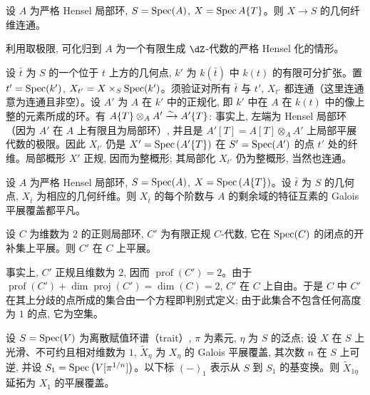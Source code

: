 \begin{proposition}\label{I:5-2-2}
设 $A$ 为严格 Hensel 局部环, $S=\operatorname{Spec}(A)$, $X=\operatorname{Spec} A\{T\}$。则 $X\to S$ 的几何纤维连通。
\end{proposition}

利用取极限, 可化归到 $A$ 为一个有限生成 $\dZ$-代数的严格 Hensel 化的情形。

设 $\bar t$ 为 $S$ 的一个位于 $t$ 上方的几何点, $k'$ 为 $k(\bar t)$ 中 $k(t)$ 的有限可分扩张。置 $t'=\operatorname{Spec}(k')$, $X_{t'}=X\times_S\operatorname{Spec}(k')$。须验证对所有 $\bar t$ 与 $t'$, $X_{t'}$ 都连通（这里连通意为连通且非空）。设 $A'$ 为 $A$ 在 $k'$ 中的正规化, 即 $k'$ 中在 $A$ 在 $k(t)$ 中的像上整的元素所成的环。有 $A\{T\}\otimes_AA'\xrightarrow\sim A'\{T\}$: 事实上, 左端为 Hensel 局部环（因为 $A'$ 在 $A$ 上有限且为局部环）, 并且是 $A'[T]=A[T]\otimes_AA'$ 上局部平展代数的极限。因此 $X_{t'}$ 仍是 $X'=\operatorname{Spec}\left(A'\{T\}\right)$ 在 $S'=\operatorname{Spec}(A')$ 的点 $t'$ 处的纤维。局部概形 $X'$ 正规, 因而为整概形; 其局部化 $X_{t'}$ 仍为整概形, 当然也连通。

\begin{proposition}\label{I:5-2-3}
设 $A$ 为严格 Hensel 局部环, $S=\operatorname{Spec}(A)$, $X=\operatorname{Spec}\left(A\{T\}\right)$。设 $\bar t$ 为 $S$ 的几何点, $X_{\bar t}$ 为相应的几何纤维。则 $X_{\bar t}$ 的每个阶数与 $A$ 的剩余域的特征互素的 Galois 平展覆盖都平凡。
\end{proposition}

\begin{lemma} \label{I:5-2-4} %
设 $C$ 为维数为 $2$ 的正则局部环, $C'$ 为有限正规 $C$-代数, 它在 $\operatorname{Spec}(C)$ 的闭点的开补集上平展。则 $C'$ 在 $C$ 上平展。
\end{lemma}

事实上, $C'$ 正规且维数为 $2$, 因而 $\operatorname{prof}(C')=2$。由于 $\operatorname{prof}(C')+\dim\operatorname{proj}(C')=\dim(C)=2$, $C'$ 在 $C$ 上自由。于是 $C$ 中 $C'$ 在其上分歧的点所成的集合由一个方程即判别式定义; 由于此集合不包含任何高度为 $1$ 的点, 它为空集。

\begin{lemma}\label{I:5-2-5} %
设 $S=\operatorname{Spec}(V)$ 为离散赋值环谱（trait）, $\pi$ 为素元, $\eta$ 为 $S$ 的泛点; 设 $X$ 在 $S$ 上光滑、不可约且相对维数为 $1$, $\widetilde X_\eta$ 为 $X_\eta$ 的 Galois 平展覆盖, 其次数 $n$ 在 $S$ 上可逆, 并设 $S_1=\operatorname{Spec}\left(V[\pi^{1/n}]\right)$。以下标 $(-)_1$ 表示从 $S$ 到 $S_1$ 的基变换。则 $\widetilde X_{1\eta}$ 延拓为 $X_1$ 的平展覆盖。
\end{lemma}

